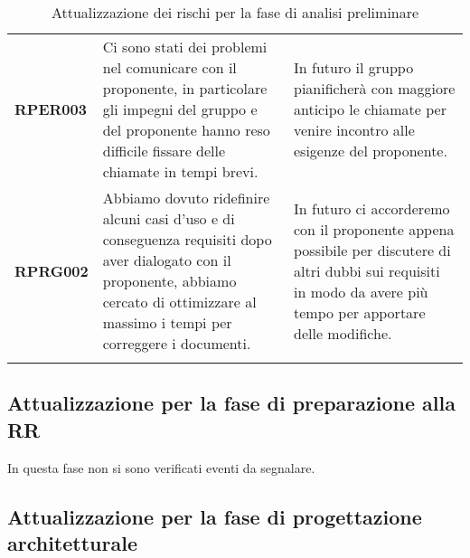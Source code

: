 \documentclass[../piano-di-progetto]{subfiles}
\begin{document}
\begin{longtable}[H]{|p{10em}|p{17em}|p{17em}|}
  \textbf{RPER003}                                    & Ci sono stati dei problemi nel comunicare con il proponente, in particolare gli impegni del gruppo e del proponente hanno reso difficile fissare delle chiamate in tempi brevi.                                         & In futuro il gruppo pianificherà con maggiore anticipo le chiamate per venire incontro alle esigenze del proponente.                                                                         \\
  \textbf{RPRG002}                                    & Abbiamo dovuto ridefinire alcuni casi d'uso e di conseguenza requisiti dopo aver dialogato con il proponente, abbiamo cercato di ottimizzare al massimo i tempi per correggere i documenti.                             & In futuro ci accorderemo con il proponente appena possibile per discutere di altri dubbi sui requisiti in modo da avere più tempo per apportare delle modifiche.                             \\
  \rowcolor{white}
  \caption{Attualizzazione dei rischi per la fase di analisi preliminare}%
  \label{tab:attualizzazione_fase_analisi_preliminare}
\end{longtable}


\subsection{Attualizzazione per la fase di preparazione alla RR}%
\label{sub:attualizzazione_fase_prep_RR}
In questa fase non si sono verificati eventi da segnalare.

\subsection{Attualizzazione per la fase di progettazione architetturale}%
\label{sub:attualizzazione_per_la_fase_di_progettazione_architetturale}
\end{document}
